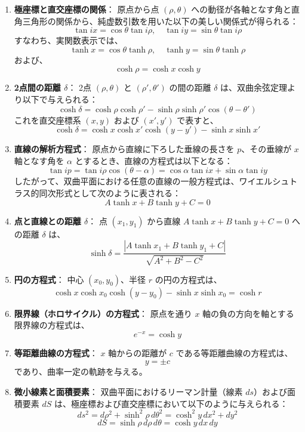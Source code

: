 \begin{enumerate}[label=\textbf{\arabic*.}]
\item \textbf{極座標と直交座標の関係}：
原点から点 $(\rho, \theta)$ への動径が各軸となす角と直角三角形の関係から、純虚数引数を用いた以下の美しい関係式が得られる：
\[
\tan ix = \cos\theta \tan i\rho, \quad \tan iy = \sin\theta \tan i\rho
\]
すなわち、実関数表示では、
\[
\tanh x = \cos\theta \tanh \rho, \quad \tanh y = \sin\theta \tanh \rho
\]
および、
\[
\cosh \rho = \cosh x \cosh y
\]

\item \textbf{2点間の距離 $\delta$}：
2点 $(\rho, \theta)$ と $(\rho', \theta')$ の間の距離 $\delta$ は、双曲余弦定理より以下で与えられる：
\[
\cosh \delta = \cosh \rho \cosh \rho' - \sinh \rho \sinh \rho' \cos(\theta - \theta')
\]
これを直交座標系 $(x, y)$ および $(x', y')$ で表すと、
\[
\cosh \delta = \cosh x \cosh x' \cosh(y - y') - \sinh x \sinh x'
\]

\item \textbf{直線の解析方程式}：
原点から直線に下ろした垂線の長さを $p$、その垂線が $x$ 軸となす角を $\alpha$ とするとき、直線の方程式は以下となる：
\[
\tan i p = \tan i \rho \cos(\theta - \alpha) = \cos\alpha \tan ix + \sin\alpha \tan iy
\]
したがって、双曲平面における任意の直線の一般方程式は、ワイエルシュトラス的同次形式として次のように表される：
\[
A \tanh x + B \tanh y + C = 0
\]

\item \textbf{点と直線との距離 $\delta$}：
点 $(x_1, y_1)$ から直線 $A \tanh x + B \tanh y + C = 0$ への距離 $\delta$ は、
\[
\sinh \delta = \frac{|A \tanh x_1 + B \tanh y_1 + C|}{\sqrt{A^2 + B^2 - C^2}}
\]

\item \textbf{円の方程式}：
中心 $(x_0, y_0)$、半径 $r$ の円の方程式は、
\[
\cosh x \cosh x_0 \cosh(y - y_0) - \sinh x \sinh x_0 = \cosh r
\]

\item \textbf{限界線（ホロサイクル）の方程式}：
原点を通り $x$ 軸の負の方向を軸とする限界線の方程式は、
\[
e^{-x} = \cosh y
\]

\item \textbf{等距離曲線の方程式}：
$x$ 軸からの距離が $c$ である等距離曲線の方程式は、
\[
y = \pm c
\]
であり、曲率一定の軌跡を与える。

\item \textbf{微小線素と面積要素}：
双曲平面におけるリーマン計量（線素 $ds$）および面積要素 $dS$ は、極座標および直交座標において以下のように与えられる：
\[
ds^2 = d\rho^2 + \sinh^2 \rho\, d\theta^2 = \cosh^2 y\, dx^2 + dy^2
\]
\[
dS = \sinh \rho\, d\rho\, d\theta = \cosh y\, dx\, dy
\]
\end{enumerate}

